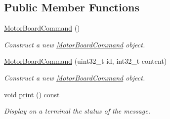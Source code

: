 \subsection*{Public Member Functions}
\begin{DoxyCompactItemize}
\item 
\hyperlink{classblmc__drivers_1_1MotorBoardCommand_ad5ac32071cbf2854135fee7bb89acf4e}{Motor\+Board\+Command} ()\hypertarget{classblmc__drivers_1_1MotorBoardCommand_ad5ac32071cbf2854135fee7bb89acf4e}{}\label{classblmc__drivers_1_1MotorBoardCommand_ad5ac32071cbf2854135fee7bb89acf4e}

\begin{DoxyCompactList}\small\item\em Construct a new \hyperlink{classblmc__drivers_1_1MotorBoardCommand}{Motor\+Board\+Command} object. \end{DoxyCompactList}\item 
\hyperlink{classblmc__drivers_1_1MotorBoardCommand_ae7cf695d2600d84929729befc3cb29f9}{Motor\+Board\+Command} (uint32\+\_\+t id, int32\+\_\+t content)
\begin{DoxyCompactList}\small\item\em Construct a new \hyperlink{classblmc__drivers_1_1MotorBoardCommand}{Motor\+Board\+Command} object. \end{DoxyCompactList}\item 
void \hyperlink{classblmc__drivers_1_1MotorBoardCommand_aa8a54ff3faa6c2b4ce50c13a0d83bcb3}{print} () const \hypertarget{classblmc__drivers_1_1MotorBoardCommand_aa8a54ff3faa6c2b4ce50c13a0d83bcb3}{}\label{classblmc__drivers_1_1MotorBoardCommand_aa8a54ff3faa6c2b4ce50c13a0d83bcb3}

\begin{DoxyCompactList}\small\item\em Display on a terminal the status of the message. \end{DoxyCompactList}\end{DoxyCompactItemize}

